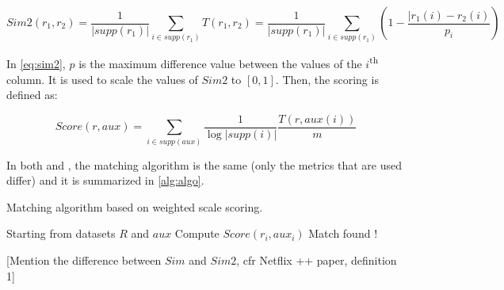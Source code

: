 \begin{equation}\label{eq:sim2}
Sim2(r_1, r_2) = \frac{1}{\lvert supp(r_1) \rvert} \sum_{i \in supp(r_1)} T(r_1, r_2) = \frac{1}{\lvert supp(r_1) \rvert} \sum_{i \in supp(r_1)} \left( 1 - \frac{\lvert r_1(i) -r_2(i)}{p_i} \right)
\end{equation} 

In \autoref{eq:sim2}, $p$ is the maximum difference value between the values of the $i$\textsuperscript{th} column. It is used to scale the values of $Sim2$ to $[0,1]$. Then, the scoring is defined as:

\begin{equation}\label{eq:score}
Score(r,aux) = \sum_{i \in supp(aux)} \frac{1}{\log\lvert supp(i) \rvert} \frac{T(r,aux(i))}{m}
\end{equation}

In both \cite{netflix} and \cite{netflix-analytic}, the matching algorithm is the same (only the metrics that are used differ) and it is summarized in \autoref{alg:algo}.

\begin{algorithm}[h]
	\caption{Matching algorithm based on weighted scale scoring.}
	\label{alg:algo}
	\begin{algorithmic}[1]
		\State Starting from datasets $R$ and $aux$
		\newline
				\State Compute $Score(r_i,aux_i)$
			\EndFor
				\State Match found !
			\EndIf
		\EndFor
	\end{algorithmic}
\end{algorithm}


[Mention the difference between $Sim$ and $Sim2$, cfr Netflix ++ paper, definition 1]


